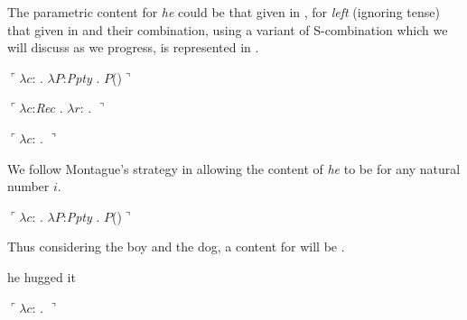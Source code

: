 The parametric content for
\textit{he} could be that given in , for \textit{left}
(ignoring tense) that given in  and their combination, using a variant
of S-combination which we will discuss as we progress, is represented
in .
\begin{ex} 
\begin{subex} 
 
\item $\ulcorner\lambda c$: . 
        $\lambda P$:\textit{Ppty} . $P$()$\urcorner$
 
\item $\ulcorner\lambda c$:\textit{Rec} . 
        $\lambda r$: . 
              $\urcorner$

            \item $\ulcorner\lambda c$:
  . 
         $\urcorner$
 
\end{subex} 
   
\end{ex}
We follow Montague's strategy in allowing the content of \textit{he}
to be \nexteg{} for any natural number $i$.
\begin{ex}
  $\ulcorner\lambda c$: . 
        $\lambda P$:\textit{Ppty}
        . $P$()$\urcorner$
\label{ex:pronoun-cont}
\end{ex} 
Thus considering the boy and the dog, a
content for  will be .
\begin{ex} 
\begin{subex} 
 
\item he hugged it 
 
\item $\ulcorner\lambda c$:
                                 . 
$\urcorner$ 
 
\end{subex} 
   
\end{ex} 
